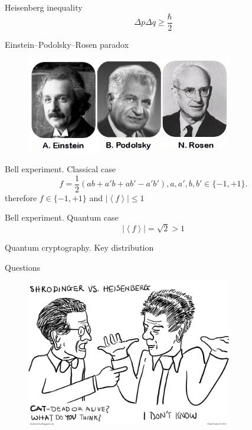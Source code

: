 \documentclass[10pt,pdf,hyperref={unicode}]{beamer}
\begin{document}
\begin{frame}{Heisenberg inequality}
  \[
  \Delta p \Delta q \ge \frac{\hbar}{2}
  \]
\end{frame}


\begin{frame}{Einstein–Podolsky–Rosen paradox}
 \begin{figure} 
   \includegraphics[width=90mm,scale=0.5]{epr.jpg}
  \end{figure}
\end{frame}

\begin{frame}{Bell experiment. Classical case}
\[
f = \frac{1}{2}\left(
a b + a' b + a b' - a' b'
\right), a,a',b,b' \in \{-1, +1\}.
\]
therefore
\(
f \in \{-1, +1\}
\)
and
\(
\left|\left<f\right>\right| \le 1
\)
\end{frame}

\begin{frame}{Bell experiment. Quantum case}
\[
\left|\left<f\right>\right| = \sqrt{2} > 1
\]
\end{frame}

\begin{frame}{Quantum cryptography. Key distribution}
 \begin{figure} 
   
 \end{figure}
\end{frame}


\begin{frame}{Questions}
 \begin{figure} 
   \includegraphics[width=90mm,scale=0.5]{questions.png}
  \end{figure}
\end{frame}
\end{document}

